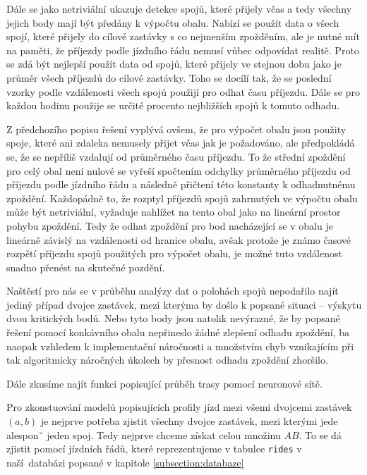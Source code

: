  \bigbreak

Dále se jako netriviální ukazuje detekce spojů, které přijely včas a tedy všechny jejich body mají být předány k výpočtu obalu. Nabízí se použít data o všech spojí, které přijely do cílové zastávky s co nejmenším zpožděním, ale je nutné mít na paměti, že příjezdy podle jízdního řádu nemusí vůbec odpovídat realitě. Proto se zdá být nejlepší použít data od spojů, které přijely ve stejnou dobu jako je průměr všech příjezdů do cílové zastávky. Toho se docílí tak, že se poslední vzorky podle vzdálenosti všech spojů použijí pro odhat času příjezdu. Dále se pro každou hodinu použije se určité procento nejbližších spojů k tomuto odhadu.

\bigbreak

Z předchozího popisu řešení vyplývá ovšem, že pro výpočet obalu jsou použity spoje, které ani zdaleka nemusely přijet včas jak je požadováno, ale předpokládá se, že se nepříliš vzdalují od průměrného času příjezdu. To že střední zpoždění pro celý obal není nulové se vyřeší spočtením odchylky průměrného příjezdu od příjezdu podle jízdního řádu a následně přičtení této konstanty k odhadnutnému zpoždění. Každopádně to, že rozptyl příjezdů spojů zahrnutých ve výpočtu obalu může být netriviální, vyžaduje nahlížet na tento obal jako na lineární prostor pohybu zpoždění. Tedy že odhat zpoždění pro bod nacházející se v obalu je lineárně závislý na vzdálenosti od hranice obalu, avšak protože je známo časové rozpětí příjezdu spojů použitých pro výpočet obalu, je možné tuto vzdálenost snadno přenést na skutečné pozdění.

\bigbreak

Naštěstí pro nás se v průběhu analýzy dat o polohách spojů nepodařilo najít jediný případ dvojce zastávek, mezi kterýma by došlo k popsané situaci -- výskytu dvou kritických bodů. Nebo tyto body jsou natolik nevýrazné, že by popsané řešení pomocí konkávního obalu nepřineslo žádné zlepšení odhadu zpoždění, ba naopak vzhledem k implementační náročnosti a množstvím chyb vznikajícím při tak algoritmicky náročných úkolech by přesnost odhadu zpoždění zhoršilo.


Dále zkusíme najít funkci popisující průběh trasy pomocí neuronové sítě.

Pro zkonstuování modelů popisujících profily jízd mezi všemi dvojcemi zastávek $(a, b)$ je nejprve potřeba zjistit všechny dvojce zastávek, mezi kterými jede alesponˇ jeden spoj. Tedy nejprve chceme získat celou množinu $AB$. To se dá zjistit pomocí jízdních řádů, které reprezentujeme v tabulce \verb-rides- v naší databázi popsané v kapitole \ref{subsection:databaze}

